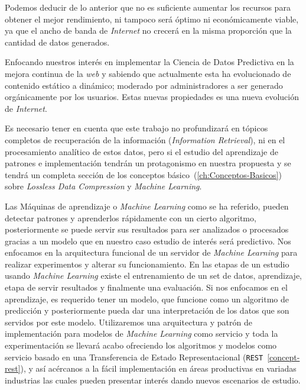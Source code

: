 	Podemos deducir de lo anterior que no es suficiente aumentar los recursos para obtener el mejor rendimiento, ni tampoco será óptimo ni económicamente viable, ya que el ancho de banda de \emph{Internet} no crecerá en la misma proporción que la cantidad de datos generados.

	Enfocando nuestros interés en implementar  la Ciencia de Datos Predictiva en la mejora continua de la \emph{web} y sabiendo que  actualmente esta ha evolucionado de  contenido estático a dinámico; moderado por administradores a ser  generado orgánicamente por los usuarios. Estas nuevas propiedades es una nueva evolución de \emph{Internet}. 
	
	Es necesario tener en cuenta que este trabajo no profundizará en tópicos completos de recuperación de la información (\emph{Information Retrieval}), ni en el procesamiento analítico de estos datos, pero si el estudio del aprendizaje de patrones e implementación tendrán un protagonismo en nuestra propuesta y se tendrá un completa sección de los conceptos básico~(\ref{ch:Conceptos-Basicos}) sobre \emph{Lossless Data Compression} y \emph{Machine Learning}.

	Las Máquinas de aprendizaje o \emph{Machine Learning} como se ha referido, pueden detectar patrones y aprenderlos rápidamente con un cierto algoritmo, posteriormente se puede servir sus resultados para ser analizados o procesados gracias a un modelo que en nuestro caso estudio de interés será predictivo. Nos enfocamos en la arquitectura funcional de un servidor de \emph{Machine Learning} para realizar experimentos y alterar su funcionamiento. En las etapas de un estudio usando \emph{Machine Learning} existe el entrenamiento de un set de datos, aprendizaje, etapa de servir resultados y finalmente una evaluación.  Si nos enfocamos en el aprendizaje, es requerido tener un modelo, que funcione como un algoritmo de predicción y posteriormente pueda dar una interpretación de los datos que son servidos por este modelo. Utilizaremos una arquitectura y patrón de implementación para modelos de \emph{Machine Learning} como servicio y toda la experimentación se llevará acabo ofreciendo los algoritmos y modelos como servicio basado en una Transferencia de Estado Representacional (\texttt{REST}~\ref{concept-rest}), y así acércanos a la fácil implementación en áreas productivas en variadas industrias las cuales pueden presentar interés dando nuevos escenarios de estudio.

	

